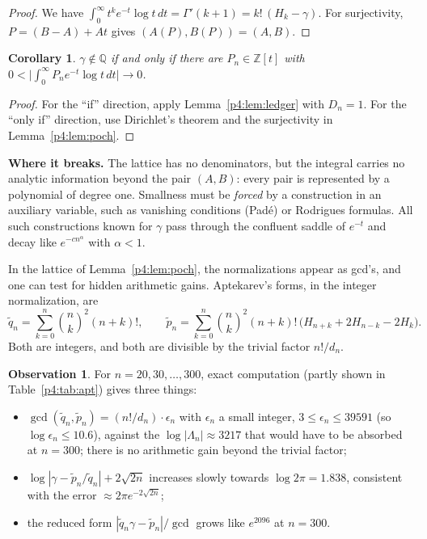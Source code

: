 \documentclass[11pt,a4paper]{article}
\newtheorem{corollary}[theorem]{Corollary}
\theoremstyle{definition}
\newtheorem{observation}[theorem]{Observation}
\theoremstyle{remark}
\newcommand{\Q}{\mathbb Q}
\newcommand{\Z}{\mathbb Z}
\numberwithin{equation}{section}
\begin{document}
\begin{proof}
We have $\int_0^\infty t^ke^{-t}\log t\,dt=\Gamma'(k+1)=k!\,(H_k-\gamma)$. For surjectivity, $P=(B-A)+At$ gives $(A(P),B(P))=(A,B)$.
\end{proof}

\begin{corollary}\label{p4:cor:poch}
$\gamma\notin\Q$ if and only if there are $P_n\in\Z[t]$ with $0<\bigl|\int_0^\infty P_ne^{-t}\log t\,dt\bigr|\to0$.
\end{corollary}

\begin{proof}
For the ``if'' direction, apply Lemma~\ref{p4:lem:ledger} with $D_n=1$. For the ``only if'' direction, use Dirichlet's theorem and the surjectivity in Lemma~\ref{p4:lem:poch}.
\end{proof}

\noindent\textbf{Where it breaks.} The lattice has no denominators, but the integral carries no analytic information beyond the pair $(A,B)$: every pair is represented by a polynomial of degree one. Smallness must be \emph{forced} by a construction in an auxiliary variable, such as vanishing conditions (Pad\'e) or Rodrigues formulas. All such constructions known for $\gamma$ pass through the confluent saddle of $e^{-t}$ and decay like $e^{-cn^\alpha}$ with $\alpha<1$.

In the lattice of Lemma~\ref{p4:lem:poch}, the normalizations appear as gcd's, and one can test for hidden arithmetic gains. Aptekarev's forms, in the integer normalization, are
\[
\tilde q_n=\sum_{k=0}^n\binom nk^2(n+k)!,\qquad
\tilde p_n=\sum_{k=0}^n\binom nk^2(n+k)!\,\bigl(H_{n+k}+2H_{n-k}-2H_k\bigr).
\]
Both are integers, and both are divisible by the trivial factor $n!/d_n$.

\begin{observation}\label{p4:obs:apt}
For $n=20,30,\dots,300$, exact computation (partly shown in Table~\ref{p4:tab:apt}) gives three things:
\begin{itemize}[leftmargin=2em]
\item $\gcd(\tilde q_n,\tilde p_n)=(n!/d_n)\cdot\epsilon_n$ with $\epsilon_n$ a small integer, $3\le\epsilon_n\le39591$ (so $\log\epsilon_n\le10.6$), against the $\log|\Lambda_n|\approx3217$ that would have to be absorbed at $n=300$; there is no arithmetic gain beyond the trivial factor;
\item $\log|\gamma-\tilde p_n/\tilde q_n|+2\sqrt{2n}$ increases slowly towards $\log 2\pi=1.838$, consistent with the error $\approx2\pi e^{-2\sqrt{2n}}$;
\item the reduced form $|\tilde q_n\gamma-\tilde p_n|/\gcd$ grows like $e^{2096}$ at $n=300$.
\end{itemize}
\end{observation}
\end{document}

